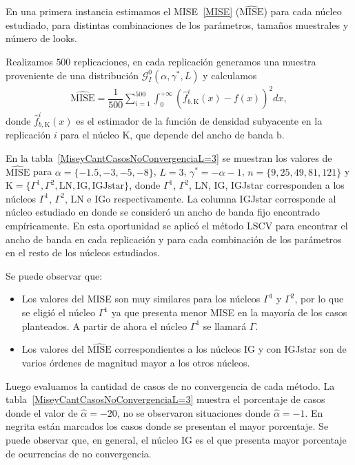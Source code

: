 En una primera instancia estimamos el MISE~\eqref{MISE} ($\widehat{\text{MISE}}$) para cada núcleo estudiado, para distintas combinaciones de los parámetros, tamaños muestrales y número de looks. 

Realizamos $500$ replicaciones, en cada replicación generamos una muestra proveniente de una distribución $\mathcal{G}_I^0(\alpha,\gamma^*,L)$ y calculamos 
\begin{align}
\label{MiseEst}
\widehat{\text{MISE}}=\dfrac{1}{500} \sum_{i=1}^{500}\int_0^{+\infty} (\widehat{f}_{b,\text{K}}^i(x)-f(x))^2 dx,
\end{align}
donde $\widehat{f}_{b,\text{K}}^i(x)$ es el estimador de la función de densidad subyacente en la replicación $i$ para el núcleo $\text{K}$, que depende del ancho de banda $\text{b}$.

En la tabla~\ref{MiseyCantCasosNoConvergenciaL=3} se muestran los valores de $\widehat{\text{MISE}}$ para $\alpha=\{-1.5,-3,-5,-8\}$, $L=3$, $\gamma^*=-\alpha-1$, $n=\{9,25,49,81,121\}$ y $\text{K}=\{\Gamma^1,\Gamma^2,\text{LN},\text{IG},\text{IGJstar\}}$, donde $\Gamma^1$, $\Gamma^2$, LN, IG, IGJstar corresponden a los núcleos $\Gamma^1$, $\Gamma^2$, LN e IGo respectivamente. La columna IGJstar corresponde al núcleo estudiado en \citet{gambini2015} donde se consideró un ancho de banda fijo encontrado empíricamente. En esta oportunidad se aplicó el método LSCV para encontrar el ancho de banda en cada replicación y para cada combinación de los parámetros en el resto de los núcleos estudiados.

Se puede observar que:
\begin{itemize}
	\item Los valores del MISE son muy similares para los núcleos $\Gamma^1$ y $\Gamma^2$, por lo que se eligió el núcleo $\Gamma^1$ ya que presenta menor MISE en la mayoría de los casos planteados. A partir de ahora el núcleo $\Gamma^1$ se llamará $\Gamma$.
	\item Los valores del $\widehat{\text{MISE}}$ correspondientes a los núcleos IG y con IGJstar son de varios órdenes de magnitud mayor a los otros núcleos.
\end{itemize} 

Luego evaluamos la cantidad de casos de no convergencia de cada método. La tabla~\ref{MiseyCantCasosNoConvergenciaL=3} muestra el porcentaje de casos donde el valor de $\widehat{\alpha}=-20$, no se observaron situaciones donde $\widehat{\alpha}=-1.$ En negrita están marcados los casos donde se presentan el mayor porcentaje. Se puede observar que, en general, el núcleo IG es el que presenta mayor porcentaje de ocurrencias de no convergencia.

